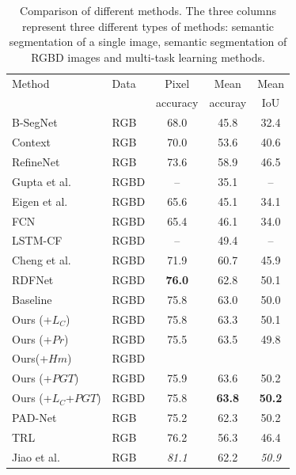 \begin{table}[tb]
	\centering
	\caption{Comparison of different methods. The three columns represent three different types of methods: semantic segmentation of a single image, semantic segmentation of RGBD images and multi-task learning methods.}
	\begin{tabular*}{8.2cm}{llccc}
		\hline
		Method & Data & Pixel & Mean  & Mean\\
		       &     & accuracy & accuray  & IoU \\
		\hline 
		B-SegNet \cite{Kendall2015} & RGB &68.0 & 45.8 & 32.4 \\
		Context \cite{Lin2016} & RGB & 70.0 & 53.6 & 40.6 \\
		RefineNet \cite{Lin2017} & RGB & 73.6 & 58.9 & 46.5\\
		\hline
		Gupta et al. \cite{Gupta2014} & RGBD & -- & 35.1 &--\\
		Eigen et al. \cite{Eigen2015} & RGBD & 65.6 & 45.1 & 34.1\\
		FCN \cite{Long2015} & RGBD & 65.4 & 46.1 & 34.0 \\
		LSTM-CF \cite{Li2016} & RGBD & --& 49.4 & -- \\
		Cheng et al.\cite{Cheng2017} & RGBD & 71.9 & 60.7 & 45.9 \\
		RDFNet \cite{Park2017} & RGBD & \bf{76.0} & 62.8 & 50.1\\	
		Baseline &RGBD & 75.8 & 63.0 & 50.0\\
		Ours (+$L_{C}$) & RGBD & 75.8 & 63.3 & 50.1\\	
		Ours (+$Pr$) & RGBD & 75.5 & 63.5 & 49.8\\
		Ours(+$Hm$) & RGBD & & &\\
		Ours (+$PGT$) & RGBD & 75.9 & 63.6 & 50.2\\
		Ours (+$L_{C}$+$PGT$)& RGBD & 75.8 & \bf{63.8} & \bf{50.2}\\
		\hline
		PAD-Net \cite{Xu2018} & RGB &75.2 & 62.3 & 50.2\\
		TRL \cite{Zhang2018} & RGB &76.2 & 56.3 & 46.4\\
		Jiao et al.\cite{Jiao2018} & RGB & \emph{81.1} & 62.2 & \emph{50.9}\\
		\hline		 		
	\end{tabular*}
	\label{Tab:Results}
\end{table}



